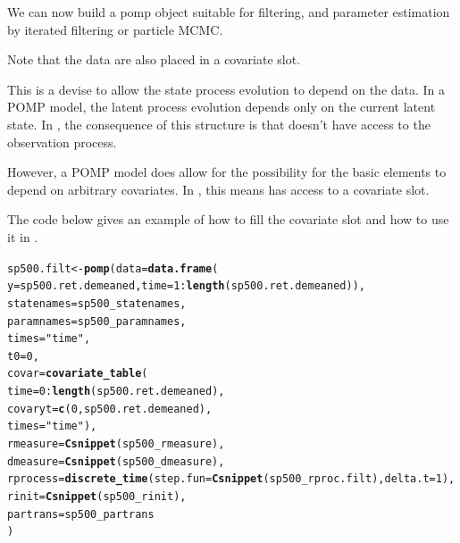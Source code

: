 \documentclass{beamer}\usepackage[]{graphicx}\usepackage[]{color}
\makeatletter
\newcommand{\hlnum}[1]{\textcolor[rgb]{0.686,0.059,0.569}{#1}}%
\newcommand{\hlstr}[1]{\textcolor[rgb]{0.192,0.494,0.8}{#1}}%
\newcommand{\hlopt}[1]{\textcolor[rgb]{0,0,0}{#1}}%
\newcommand{\hlstd}[1]{\textcolor[rgb]{0.345,0.345,0.345}{#1}}%
\newcommand{\hlkwb}[1]{\textcolor[rgb]{0.69,0.353,0.396}{#1}}%
\newcommand{\hlkwc}[1]{\textcolor[rgb]{0.333,0.667,0.333}{#1}}%
\newcommand{\hlkwd}[1]{\textcolor[rgb]{0.737,0.353,0.396}{\textbf{#1}}}%
\newenvironment{kframe}{%
 \def\at@end@of@kframe{}%
 \ifinner\ifhmode%
  \def\at@end@of@kframe{\end{minipage}}%
  \begin{minipage}{\columnwidth}%
 \fi\fi%
 \def\FrameCommand##1{\hskip\@totalleftmargin \hskip-\fboxsep
 \colorbox{shadecolor}{##1}\hskip-\fboxsep
     \hskip-\linewidth \hskip-\@totalleftmargin \hskip\columnwidth}%
 \MakeFramed {\advance\hsize-\width
   \@totalleftmargin\z@ \linewidth\hsize
   \@setminipage}}%
 {\par\unskip\endMakeFramed%
 \at@end@of@kframe}
\newenvironment{knitrout}{}{} %
\makeatother
\begin{document}
\begin{frame}[fragile]

\bi

\item We can now build a pomp object suitable for filtering, and parameter estimation by iterated filtering or particle MCMC. 

\item Note that the data are also placed in a covariate slot. 

\item This is a devise to allow the state process evolution to depend on the data. In a POMP model, the latent process evolution depends only on the current latent state. In , the consequence of this structure is that  doesn't have access to the observation process. 

\item However, a POMP model does allow for the possibility for the basic elements to depend on arbitrary covariates. In , this means  has access to a covariate slot.

\item The code below gives an example of how to fill the covariate slot and how to use it in .


\ei

\end{frame}

\begin{frame}[fragile]

\begin{knitrout}\small
{}\color{fgcolor}\begin{kframe}
\begin{alltt}
\hlstd{sp500.filt} \hlkwb{<-} \hlkwd{pomp}\hlstd{(}\hlkwc{data}\hlstd{=}\hlkwd{data.frame}\hlstd{(}
    \hlkwc{y}\hlstd{=sp500.ret.demeaned,}\hlkwc{time}\hlstd{=}\hlnum{1}\hlopt{:}\hlkwd{length}\hlstd{(sp500.ret.demeaned)),}
  \hlkwc{statenames}\hlstd{=sp500_statenames,}
  \hlkwc{paramnames}\hlstd{=sp500_paramnames,}
  \hlkwc{times}\hlstd{=}\hlstr{"time"}\hlstd{,}
  \hlkwc{t0}\hlstd{=}\hlnum{0}\hlstd{,}
  \hlkwc{covar}\hlstd{=}\hlkwd{covariate_table}\hlstd{(}
    \hlkwc{time}\hlstd{=}\hlnum{0}\hlopt{:}\hlkwd{length}\hlstd{(sp500.ret.demeaned),}
    \hlkwc{covaryt}\hlstd{=}\hlkwd{c}\hlstd{(}\hlnum{0}\hlstd{,sp500.ret.demeaned),}
    \hlkwc{times}\hlstd{=}\hlstr{"time"}\hlstd{),}
  \hlkwc{rmeasure}\hlstd{=}\hlkwd{Csnippet}\hlstd{(sp500_rmeasure),}
  \hlkwc{dmeasure}\hlstd{=}\hlkwd{Csnippet}\hlstd{(sp500_dmeasure),}
  \hlkwc{rprocess}\hlstd{=}\hlkwd{discrete_time}\hlstd{(}\hlkwc{step.fun}\hlstd{=}\hlkwd{Csnippet}\hlstd{(sp500_rproc.filt),}\hlkwc{delta.t}\hlstd{=}\hlnum{1}\hlstd{),}
  \hlkwc{rinit}\hlstd{=}\hlkwd{Csnippet}\hlstd{(sp500_rinit),}
  \hlkwc{partrans}\hlstd{=sp500_partrans}
\hlstd{)}
\end{alltt}
\end{kframe}
\end{knitrout}

\end{frame}
\end{document}
